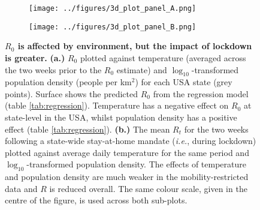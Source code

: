 \documentclass[12pt,english,a4paper]{article}
\newcommand{\RO}{$R_0$\xspace}
\begin{document}
\begin{figure}[ht]
\begin{subfigure}{.5\textwidth}
  \centering
  \texttt{[image: ../figures/3d\_plot\_panel\_A.png]}  
  \caption{}
\end{subfigure}
\begin{subfigure}{.5\textwidth}
  \centering
  \texttt{[image: ../figures/3d\_plot\_panel\_B.png]}  
  \caption{}
\end{subfigure}
\caption{{\bf \RO is affected by environment, but the impact of lockdown is greater.} {\bf (a.)} \RO plotted against temperature (averaged across the two weeks prior to the \RO estimate) and $\log_{10}$-transformed population density (people per km$^2$) for each USA state (grey points). Surface shows the predicted \RO from the regression model (table \ref{tab:regression}). Temperature has a negative effect on \RO at state-level in the USA, whilst population density has a positive effect (table \ref{tab:regression}). {\bf (b.)} The mean $R_t$ for the two weeks following a state-wide stay-at-home mandate (\emph{i.e.}, during lockdown) plotted against average daily temperature for the same period and $\log_{10}$-transformed population density. The effects of temperature and population density are much weaker in the mobility-restricted data and $R$ is reduced overall. The same colour scale, given in the centre of the figure, is used across both sub-plots.}
\label{fig:R0_Rt_plots}
\end{figure}
\end{document}
